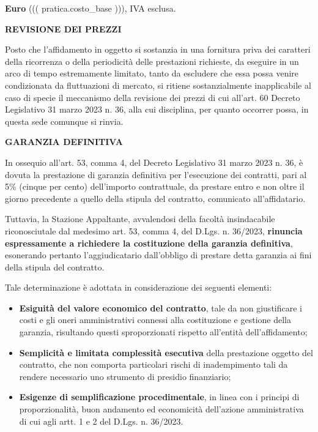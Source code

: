 \textbf{Euro} ((( pratica.costo_base ))), IVA esclusa.

\textbf{REVISIONE DEI PREZZI}

Posto che l'affidamento in oggetto si sostanzia in una fornitura priva
dei caratteri della ricorrenza o della periodicità delle prestazioni
richieste, da eseguire in un arco di tempo estremamente limitato, tanto da
escludere che essa possa venire condizionata da fluttuazioni di mercato,
si ritiene sostanzialmente inapplicabile al caso di specie il meccanismo
della revisione dei prezzi di cui all'art. 60 Decreto Legislativo
31 marzo 2023 n. 36, alla cui disciplina, per quanto occorrer possa,
in questa sede comunque si rinvia.

\textbf{GARANZIA DEFINITIVA}

In ossequio all'art. 53, comma 4, del Decreto Legislativo 31 marzo 2023 
n. 36, \`e dovuta la prestazione di garanzia definitiva per l'esecuzione 
dei contratti, pari al 5\% (cinque per cento) dell'importo contrattuale, 
da prestare entro e non oltre il giorno precedente a quello della stipula 
del contratto, comunicato all'affidatario.

Tuttavia, la Stazione Appaltante, avvalendosi della facolt\`a insindacabile
riconosciutale dal medesimo art. 53, comma 4, del D.Lgs. n. 36/2023, 
\textbf{rinuncia espressamente a richiedere la costituzione della garanzia
definitiva}, esonerando pertanto l'aggiudicatario dall'obbligo di prestare
detta garanzia ai fini della stipula del contratto.

Tale determinazione è adottata in considerazione dei seguenti elementi:
\begin{itemize}
	\item
	\textbf{Esiguità del valore economico del contratto}, tale da non
	giustificare i costi e gli oneri amministrativi connessi alla
	costituzione e gestione della garanzia, risultando questi sproporzionati
	rispetto all'entità dell'affidamento;
	\item
	\textbf{Semplicità e limitata complessità esecutiva} della prestazione
	oggetto del contratto, che non comporta particolari rischi di inadempimento
	tali da rendere necessario uno strumento di presidio finanziario;
	\item
	\textbf{Esigenze di semplificazione procedimentale}, in linea con i
	principi di proporzionalit\`a, buon andamento ed economicit\`a dell'azione
	amministrativa di cui agli artt. 1 e 2 del D.Lgs. n. 36/2023.
\end{itemize}


